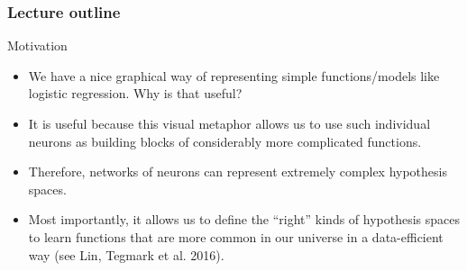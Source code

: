 










\begin{frame}
\frametitle{Lecture outline}
\tableofcontents
\end{frame}

\begin{frame} {Motivation}
  \begin{itemize}
    \vspace{2mm}
    \item We have a nice graphical way of representing simple functions/models like logistic regression. Why is that useful?
    \vspace{5mm}
    \item It is useful because this visual metaphor allows us to use such individual neurons as building blocks of considerably more complicated functions.
    \vspace{5mm}
    \item Therefore, networks of neurons can represent extremely complex hypothesis spaces.
    \vspace{5mm}
    \item Most importantly, it allows us to define the \enquote{right} kinds of hypothesis spaces to learn functions that are more common in our universe in a data-efficient way (see Lin, Tegmark et al. 2016).
  \end{itemize}
\end{frame}

